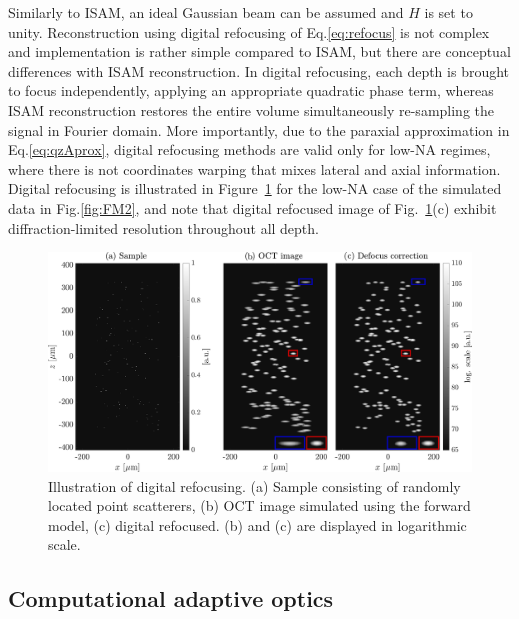 Similarly to ISAM, an ideal Gaussian beam can be assumed and $H$ is set to unity. Reconstruction using digital refocusing of Eq.\eqref{eq:refocus} is not complex and implementation is rather simple compared to ISAM, but there are conceptual differences with ISAM reconstruction. In digital refocusing, each depth is brought to focus independently, applying an appropriate quadratic phase term, whereas ISAM reconstruction restores the entire volume simultaneously re-sampling the signal in Fourier domain. More importantly, due to the paraxial approximation in Eq.\eqref{eq:qzAprox}, digital refocusing methods are valid only for low-NA regimes, where there is not coordinates warping that mixes lateral and axial information. Digital refocusing is illustrated in Figure~\ref{fig:IM2} for the low-NA case of the simulated data in Fig.\ref{fig:FM2}, and note that digital refocused image of Fig.~\ref{fig:IM2}(c) exhibit diffraction-limited resolution throughout all depth.

\begin{figure}[htb!]
    \centering
    \includegraphics[width=\textwidth]{Figures/TheoreticalBasis/IM_Refocus.pdf}
    \caption[Illustration of digital refocusing.]{Illustration of digital refocusing. (a) Sample consisting of randomly located point scatterers, (b) OCT image simulated using the forward model, (c) digital refocused. (b) and (c) are displayed in logarithmic scale.}
    \label{fig:IM2}
\end{figure}

\subsection{Computational adaptive optics}\label{sec:CAO}

